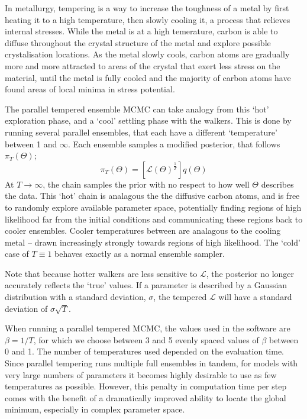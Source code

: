 In metallurgy, tempering is a way to increase the toughness of a metal by first heating it to a high temperature, then slowly cooling it, a process that relieves internal stresses.
While the metal is at a high temerature, carbon is able to diffuse throughout the crystal structure of the metal and explore possible crystalisation locations. As the metal slowly cools, carbon atoms are gradually more and more attracted to areas of the crystal that exert less stress on the material, until the metal is fully cooled and the majority of carbon atoms have found areas of local minima in stress potential.

The parallel tempered ensemble MCMC can take analogy from this `hot' exploration phase, and a `cool' settling phase with the walkers. This is done by running several parallel ensembles, that each have a different `temperature' between 1 and $\infty$. Each ensemble samples a modified posterior, that follows $\pi_T(\Theta)$;
\begin{equation}
    \pi_T(\Theta) = [\mathcal{L}(\Theta)^\frac{1}{T}] q(\Theta)
\end{equation}
At $T \rightarrow \infty$, the chain samples the prior with no respect to how well $\Theta$ describes the data. This `hot' chain is analagous the the diffusive carbon atoms, and is free to randomly explore available parameter space, potentially finding regions of high likelihood far from the initial conditions and communicating these regions back to cooler ensembles. Cooler temperatures between are analagous to the cooling metal -- drawn increasingly strongly towards regions of high likelihood.
The `cold' case of $T \equiv 1$ behaves exactly as a normal ensemble sampler.

Note that because hotter walkers are less sensitive to $\mathcal{L}$, the posterior no longer accurately reflects the `true' values. If a parameter is described by a Gaussian distribution with a standard deviation, $\sigma$, the tempered $\mathcal{L}$ will have a standard deviation of $\sigma \sqrt{T}$.

When running a parallel tempered MCMC, the values used in the software are $\beta = 1/T$, for which we choose between 3 and 5 evenly spaced values of $\beta$ between 0 and 1.
The number of temperatures used depended on the evaluation time. Since parallel tempering runs multiple full ensembles in tandem, for models with very large numbers of parameters it becomes highly desirable to use as few temperatures as possible. However, this penalty in computation time per step comes with the benefit of a dramatically improved ability to locate the global minimum, especially in complex parameter space.



